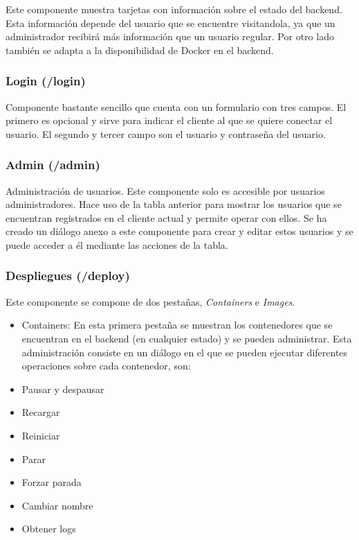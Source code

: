 Este componente muestra tarjetas con información sobre el estado del backend. Esta información depende del usuario que se encuentre visitandola, ya que un administrador recibirá más información que un usuario regular. Por otro lado también se adapta a la disponibilidad de Docker en el backend.


\subsubsection{Login (/login)}


Componente bastante sencillo que cuenta con un formulario con tres campos. El primero es opcional y sirve para indicar el cliente al que se quiere conectar el usuario. El segundo y tercer campo son el usuario y contraseña del usuario.


\subsubsection{Admin (/admin)}


Administración de usuarios. Este componente solo es accesible por usuarios administradores. Hace uso de la tabla anterior para mostrar los usuarios que se encuentran registrados en el cliente actual y permite operar con ellos. Se ha creado un diálogo anexo a este componente para crear y editar estos usuarios y se puede acceder a él mediante las acciones de la tabla.



\subsubsection{Despliegues (/deploy)}

Este componente se compone de dos pestañas, \textit{Containers} e \textit{Images}.
\begin{itemize}
	\item Containers: En esta primera pestaña se muestran los contenedores que se encuentran en el backend (en cualquier estado) y se pueden administrar. Esta administración consiste en un diálogo en el que se pueden ejecutar diferentes operaciones sobre cada contenedor, son:
	\item Pausar y despausar
	\item Recargar
	\item Reiniciar
	\item Parar
	\item Forzar parada
	\item Cambiar nombre
	\item Obtener logs
\end{itemize}

